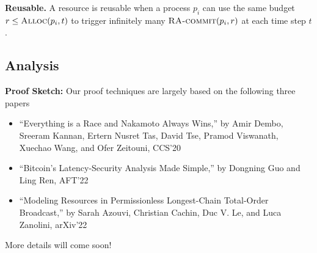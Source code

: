 \documentclass[12pt,draftcls,onecolumn]{IEEEtran}
\newcommand{\Alloc}{\textsc{Alloc}}
\begin{document}
{\bf Reusable.} A resource is reusable when a process $p_i$ can use the same budget $r \le \Alloc(p_i, t)$ to trigger infinitely many $\textsc{RA-commit}(p_i, r)$ at each time step $t$.


\subsection{Analysis}

{\bf Proof Sketch:} Our proof techniques are largely based on the following three papers
\begin{itemize}
    \item ``Everything is a Race and Nakamoto Always Wins,'' by Amir Dembo, Sreeram Kannan, Ertern Nusret Tas, David Tse, Pramod Viswanath, Xuechao Wang, and Ofer Zeitouni, CCS'20
    \item ``Bitcoin's Latency-Security Analysis Made Simple,'' by Dongning Guo and Ling Ren, AFT'22
    \item ``Modeling Resources in Permissionless Longest-Chain Total-Order Broadcast,'' by Sarah Azouvi, Christian Cachin, Duc V. Le, and Luca Zanolini, arXiv'22
\end{itemize}

More details will come soon!
\end{document}
